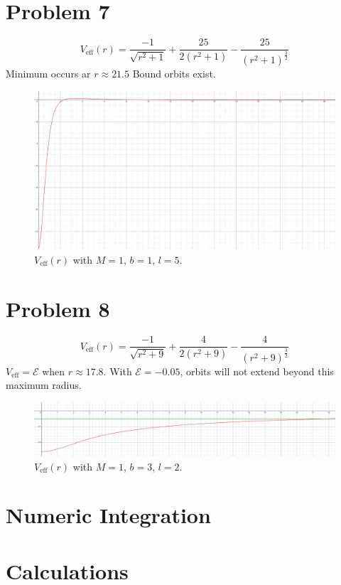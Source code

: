\documentclass[12pt]{article}
\begin{document}
\section*{Problem 7}
\[ V_\text{eff}(r) = \frac{-1}{\sqrt{r^2 + 1}} + \frac{25}{2(r^2 + 1)} - \frac{25}{(r^2 + 1)^\frac{3}{2}} \]
Minimum occurs ar $r \approx 21.5$ Bound orbits exist.
\begin{figure}[h]
    \includegraphics[scale=0.25]{prob7.PNG}
    \centering
    \caption{$V_\text{eff}(r)$ with $M=1$, $b=1$, $l=5$.}
    \label{fig2}
\end{figure}

\section*{Problem 8}
\[ V_\text{eff}(r) = \frac{-1}{\sqrt{r^2 + 9}} + \frac{4}{2(r^2 + 9)} - \frac{4}{(r^2 + 9)^\frac{3}{2}} \]
$V_\text{eff} = \mathcal{E}$ when $r \approx 17.8$. With $\mathcal{E} = -0.05$, orbits will not extend beyond this maximum radius.
\begin{figure}[h]
    \includegraphics[scale=0.3]{prob8.PNG}
    \centering
    \caption{$V_\text{eff}(r)$ with $M=1$, $b=3$, $l=2$.}
    \label{fig3}
\end{figure}

\section*{Numeric Integration}


\section*{Calculations}

\end{document}
